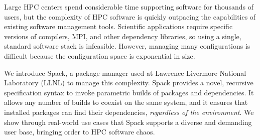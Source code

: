 
Large HPC centers spend considerable time supporting software for thousands of users, but the complexity of HPC software is quickly outpacing the capabilities of existing software management tools. Scientific applications require specific versions of compilers, MPI, and other dependency libraries, so using a single, standard software stack is infeasible.  However, managing many configurations is difficult because the configuration space is exponential in size.

We introduce Spack, a package manager used at Lawrence Livermore National Laboratory (LLNL) to manage this complexity. Spack provides a novel, recursive specification syntax to invoke parametric builds of packages and dependencies.  It allows any number of builds to coexist on the same system, and it ensures that installed packages can find their dependencies, {\it regardless of the environment}. We show through real-world use cases that Spack supports a diverse and demanding user base, bringing order to HPC software chaos.
